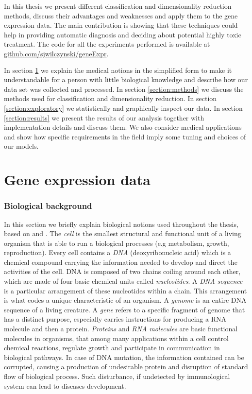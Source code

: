 \documentclass[shortabstract, english, mgr]{iithesis}
\begin{document}
In this thesis we present different classification and dimensionality reduction methods, discuss their advantages and weaknesses and apply them to the gene expression data. The main contribution is showing that these techniques could help in providing automatic diagnosis and deciding about potential highly toxic treatment. The code for all the experiments performed is available at \url{github.com/sjwilczynski/geneExpr}.  


In section \ref{section:bio} we explain the medical notions in the simplified form to make it understandable for a person with little biological knowledge and describe how our data set was collected and processed. In section \ref{section:methods} we discuss the methods used for classification and dimensionality reduction. In section \ref{section:exploratory} we statistically and graphically inspect our data. In section \ref{section:results} we present the results of our analysis together with implementation details and discuss them. We also consider medical applications and show how specific requirements in the field imply some tuning and choices of our models.

\section{Gene expression data} \label{section:bio}

\subsubsection{Biological background} 
In this section we briefly explain biological notions used throughout the thesis, based on \cite{NHGRI} and \cite[chapters~11,12]{GeneExpr}. The \textit{cell} is the smallest structural and functional unit of a living organism that is able to run a biological processes (e.g metabolism, growth, reproduction). Every cell contains a \textit{DNA} (deoxyribonucleic acid) which is a chemical compound carrying the information needed to develop and direct the activities of the cell. DNA is composed of two chains coiling around each other, which are made of four basic chemical units called \textit{nucleotides}. A \textit{DNA sequence} is a particular arrangement of these nucleotides within a chain. This arrangement is what codes a unique characteristic of an organism. A \textit{genome} is an entire DNA sequence of a living creature. A \textit{gene} refers to a specific fragment of genome that has a distinct purpose, especially carries instructions for producing a RNA molecule and then a protein. \textit{Proteins} and \textit{RNA molecules} are basic functional molecules in organisms, that among many applications within a cell control chemical reactions, regulate growth and participate in communication in biological pathways. In case of DNA mutation, the information contained can be corrupted, causing a production of undesirable protein and disruption of standard flow of biological process. Such disturbance, if undetected by immunological system can lead to diseases development.
\end{document}
